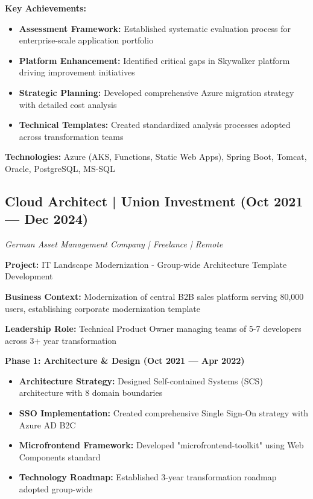 \documentclass[10pt,a4paper]{article}
\begin{document}
\textbf{Key Achievements:}
\begin{itemize}[leftmargin=*,noitemsep,topsep=0pt]
\item \textbf{Assessment Framework:} Established systematic evaluation process for enterprise-scale application portfolio
\item \textbf{Platform Enhancement:} Identified critical gaps in Skywalker platform driving improvement initiatives
\item \textbf{Strategic Planning:} Developed comprehensive Azure migration strategy with detailed cost analysis
\item \textbf{Technical Templates:} Created standardized analysis processes adopted across transformation teams
\end{itemize}

\textbf{Technologies:} Azure (AKS, Functions, Static Web Apps), Spring Boot, Tomcat, Oracle, PostgreSQL, MS-SQL

\subsection{Cloud Architect | Union Investment (Oct 2021 — Dec 2024)}
\textit{German Asset Management Company | Freelance | Remote}

\textbf{Project:} IT Landscape Modernization - Group-wide Architecture Template Development

\textbf{Business Context:} Modernization of central B2B sales platform serving 80,000 users, establishing corporate modernization template

\textbf{Leadership Role:} Technical Product Owner managing teams of 5-7 developers across 3+ year transformation

\textbf{Phase 1: Architecture \& Design (Oct 2021 — Apr 2022)}
\begin{itemize}[leftmargin=*,noitemsep,topsep=0pt]
\item \textbf{Architecture Strategy:} Designed Self-contained Systems (SCS) architecture with 8 domain boundaries
\item \textbf{SSO Implementation:} Created comprehensive Single Sign-On strategy with Azure AD B2C
\item \textbf{Microfrontend Framework:} Developed "microfrontend-toolkit" using Web Components standard
\item \textbf{Technology Roadmap:} Established 3-year transformation roadmap adopted group-wide
\end{itemize}
\end{document}
